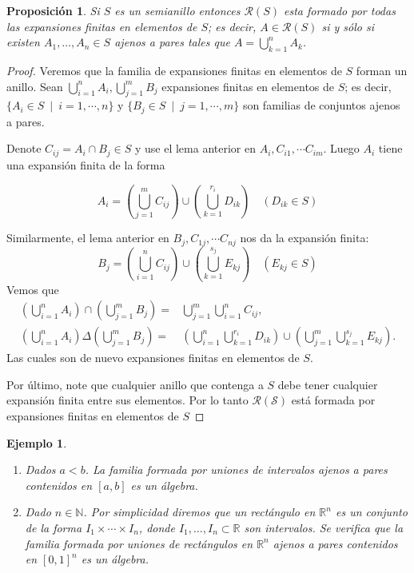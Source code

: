 \documentclass[twoside,12pt,a4 paper,openright]{book}
\newtheorem{pro}[claim]{Proposici\'on}
\newtheorem{ejem}[claim]{Ejemplo}
\begin{document}
\begin{pro}
Si  $S$ es un semianillo entonces  $ \mathcal R (S)$
 esta formado por todas las expansiones finitas en elementos de $S$; es decir, $A\in \mathcal R(S) $ si y s\'olo si existen 
 $A_1,\dots, A_n\in S$ ajenos a pares tales que $\displaystyle A=\bigcup_{k=1}^n  A_k$.
\end{pro}
\begin{proof}
Veremos que la familia de expansiones finitas en elementos de $S$ forman un anillo. Sean $\displaystyle \bigcup_{i = 1}^{n} A_i, \bigcup_{j= 1}^{m} B_j$ expansiones finitas en elementos de $S$; es decir,     $\{A_i  \in S \ \mid  \  i = 1,\cdots , n\}$ y $\{B_j  \in S \ \mid \ j=1,\cdots,m\}$ son familias de conjuntos ajenos a pares. 

Denote $C_{ij} = A_i \cap B_j \in S$ y use  el lema anterior en $A_i, C_{i1}, \cdots C_{im}$. Luego  $A_i$ tiene una expansi\'on finita de la forma

$$A_i = \left(\bigcup_{j= 1}^{m} C_{ij} \right)\cup \left(\bigcup_{k= 1}^{r_i}D_{ik}\right) \quad (D_{ik} \in S)$$

Similarmente, 
el lema anterior en $B_j, C_{1j}, \cdots C_{nj}$ nos da la expansi\'on finita:  
$$B_j = \left(\bigcup_{i= 1}^{n} C_{ij} \right)\cup \left(\bigcup_{k= 1}^{s_j}E_{kj}\right) \quad (E_{kj} \in S)$$
Vemos que 
\begin{align*}
    \left(\bigcup_{i = 1}^{n}A_i\right) \cap \left(\bigcup_{j=1}^{m}B_j\right) = & \bigcup_{j=1}^{m} \bigcup_{i=1}^{n}C_{ij}   ,\\
     \left(\bigcup_{i = 1}^{n}A_i\right) \Delta  \left(\bigcup_{j=1}^{m}B_j\right) = & \left(\bigcup_{i = 1}^{n}\bigcup_{k= 1}^{r_i}D_{ik}\right)\cup \left(\bigcup_{j = 1}^{m}\bigcup_{k= 1}^{s_j}E_{kj}\right).
\end{align*}
Las cuales son de nuevo expansiones finitas en elementos de $S$. 

Por \'ultimo, note  que cualquier    anillo que contenga a $S$ debe  tener  cualquier expansi\'on finita  entre sus elementos. Por lo tanto $\mathcal{R(S)}$ est\'a formada por expansiones finitas en elementos de $S$

\end{proof}



\begin{ejem} \
\begin{enumerate}
\item 
Dados $a<b$.  La  familia  formada por uniones de   intervalos ajenos a pares contenidos en  $ [a,b]$ es   un \'algebra.
\item Dado $n\in \mathbb N$. Por simplicidad diremos que un rect\'angulo  en $\mathbb R^n$ es un conjunto de la forma $I_1 \times \cdots \times I_n$, donde $I_1,\dots, I_n \subset \mathbb R$ son intervalos.  Se verifica que la  familia  formada por uniones de  rect\'angulos en $\mathbb R^n$  ajenos a pares contenidos en  $ [0,1 ]^n$ es un \'algebra.    
\end{enumerate}
\end{ejem}
\end{document}
